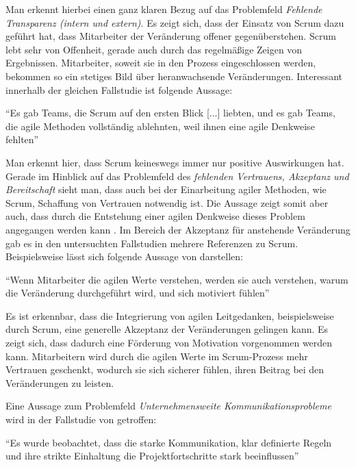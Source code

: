 Man erkennt hierbei einen ganz klaren Bezug auf das Problemfeld \textit{Fehlende Transparenz (intern und extern)}. Es zeigt sich, dass der Einsatz von Scrum dazu geführt hat, dass Mitarbeiter der Veränderung offener gegenüberstehen. Scrum lebt sehr von Offenheit, gerade auch durch das regelmäßige Zeigen von Ergebnissen. Mitarbeiter, soweit sie in den Prozess eingeschlossen werden, bekommen so ein stetiges Bild über heranwachsende Veränderungen. Interessant innerhalb der gleichen Fallstudie ist folgende Aussage:

\begin{center}
	``Es gab Teams, die Scrum auf den ersten Blick [...] liebten, und es gab Teams, die agile Methoden vollständig ablehnten, weil ihnen eine agile Denkweise fehlten'' \cite[S. 5]{fuchs_adapting_2019}
\end{center}

Man erkennt hier, dass Scrum keineswegs immer nur positive Auswirkungen hat. Gerade im Hinblick auf das Problemfeld des \textit{fehlenden Vertrauens, Akzeptanz und Bereitschaft} sieht man, dass auch bei der  Einarbeitung agiler Methoden, wie Scrum, Schaffung von Vertrauen notwendig ist. Die Aussage zeigt somit aber auch, dass durch die Entstehung einer agilen Denkweise dieses Problem angegangen werden kann \cite{hofert_agile_2018}. Im Bereich der Akzeptanz für anstehende  Veränderung gab es in den untersuchten Fallstudien mehrere Referenzen zu Scrum. Beispielsweise lässt sich folgende Aussage von  darstellen:

\begin{center}
	``Wenn Mitarbeiter die agilen Werte verstehen, werden sie auch verstehen, warum die Veränderung durchgeführt wird, und sich motiviert fühlen'' \cite[S. 17]{dikert_challenges_2016}
\end{center}

Es ist erkennbar, dass die Integrierung von agilen Leitgedanken, beispielsweise durch Scrum, eine generelle Akzeptanz der Veränderungen gelingen kann. Es zeigt sich, dass dadurch eine Förderung von Motivation vorgenommen werden kann. Mitarbeitern wird durch die agilen Werte im Scrum-Prozess mehr Vertrauen geschenkt, wodurch sie sich sicherer fühlen, ihren Beitrag bei den Veränderungen zu leisten.

Eine Aussage zum Problemfeld \textit{Unternehmensweite Kommunikationsprobleme} wird in der Fallstudie von  getroffen:

\begin{center}
	``Es wurde beobachtet, dass die starke Kommunikation, klar definierte Regeln und ihre strikte Einhaltung die Projektfortschritte stark beeinflussen'' \cite[S. 4]{alawairdhi_agile_2016}
\end{center}

